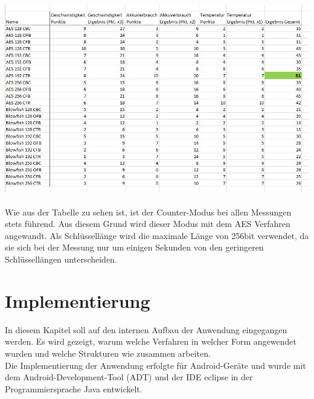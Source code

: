 \documentclass[10pt, a4paper,headsepline]{scrreprt}
\begin{document}
\includegraphics[scale=0.65]{tabelle_Cryptovergleich_einzeln.JPG} \\ \\
Wie aus der Tabelle zu sehen ist, ist der Counter-Modus bei allen Messungen stets führend. Aus diesem Grund wird dieser Modus mit dem AES Verfahren angewandt. Als Schlüssellänge wird die maximale Länge von 256bit verwendet, da sie sich bei der Messung nur um einigen Sekunden von den geringeren Schlüssellängen unterscheiden.

\chapter{Implementierung}
In diesem Kapitel soll auf den internen Aufbau der Anwendung eingegangen werden. Es wird gezeigt, warum welche Verfahren in welcher Form angewendet wurden und welche Strukturen wie zusammen arbeiten. \\
Die Implementierung der Anwendung erfolgte für Android-Geräte und wurde mit dem Android-Development-Tool (ADT) und der IDE eclipse in der Programmiersprache Java entwickelt.  
\end{document}
